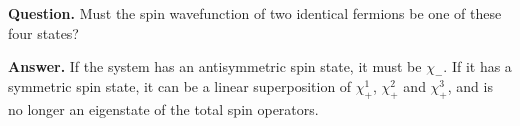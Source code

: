 \textbf{Question.} Must the spin wavefunction of two identical fermions be one of these four states?

\textbf{Answer.} If the system has an antisymmetric spin state, it must be $\chi_-$. If it has a symmetric spin state, it can be a linear superposition of $\chi_+^1$, $\chi_+^2$ and $\chi_+^3$, and is no longer an eigenstate of the total spin operators.